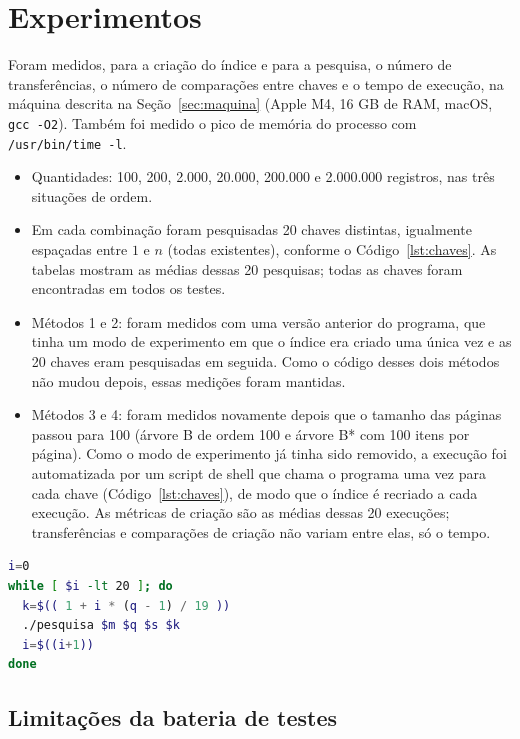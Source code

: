 \documentclass{article}
\begin{document}
\clearpage
\section{Experimentos}

Foram medidos, para a criação do índice e para a pesquisa, o número de transferências, o número de comparações entre chaves e o tempo de execução, na máquina descrita na Seção~\ref{sec:maquina} (Apple M4, 16 GB de RAM, macOS, \texttt{gcc -O2}). Também foi medido o pico de memória do processo com \texttt{/usr/bin/time -l}.

\begin{itemize}
    \item Quantidades: 100, 200, 2.000, 20.000, 200.000 e 2.000.000 registros, nas três situações de ordem.
    \item Em cada combinação foram pesquisadas 20 chaves distintas, igualmente espaçadas entre $1$ e $n$ (todas existentes), conforme o Código~\ref{lst:chaves}. As tabelas mostram as médias dessas 20 pesquisas; todas as chaves foram encontradas em todos os testes.
    \item Métodos 1 e 2: foram medidos com uma versão anterior do programa, que tinha um modo de experimento em que o índice era criado uma única vez e as 20 chaves eram pesquisadas em seguida. Como o código desses dois métodos não mudou depois, essas medições foram mantidas.
    \item Métodos 3 e 4: foram medidos novamente depois que o tamanho das páginas passou para 100 (árvore B de ordem 100 e árvore B* com 100 itens por página). Como o modo de experimento já tinha sido removido, a execução foi automatizada por um script de shell que chama o programa uma vez para cada chave (Código~\ref{lst:chaves}), de modo que o índice é recriado a cada execução. As métricas de criação são as médias dessas 20 execuções; transferências e comparações de criação não variam entre elas, só o tempo.
\end{itemize}

\begin{lstlisting}[caption={Escolha das 20 chaves do experimento (script de shell).},label={lst:chaves},language=sh]
i=0
while [ $i -lt 20 ]; do
  k=$(( 1 + i * (q - 1) / 19 ))
  ./pesquisa $m $q $s $k
  i=$((i+1))
done
\end{lstlisting}

\subsection{Limitações da bateria de testes}
\end{document}

